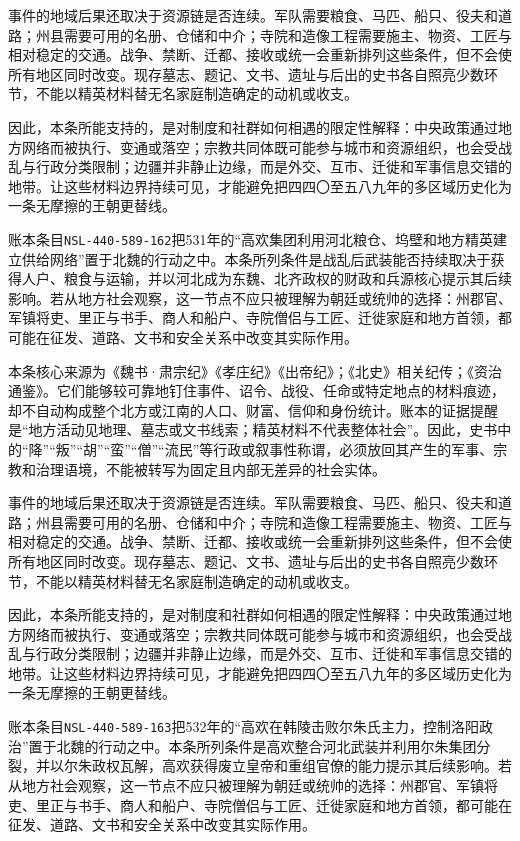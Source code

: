 事件的地域后果还取决于资源链是否连续。军队需要粮食、马匹、船只、役夫和道路；州县需要可用的名册、仓储和中介；寺院和造像工程需要施主、物资、工匠与相对稳定的交通。战争、禁断、迁都、接收或统一会重新排列这些条件，但不会使所有地区同时改变。现存墓志、题记、文书、遗址与后出的史书各自照亮少数环节，不能以精英材料替无名家庭制造确定的动机或收支。

因此，本条所能支持的，是对制度和社群如何相遇的限定性解释：中央政策通过地方网络而被执行、变通或落空；宗教共同体既可能参与城市和资源组织，也会受战乱与行政分类限制；边疆并非静止边缘，而是外交、互市、迁徙和军事信息交错的地带。让这些材料边界持续可见，才能避免把四四〇至五八九年的多区域历史化为一条无摩擦的王朝更替线。

账本条目\texttt{NSL-440-589-162}把531年的“高欢集团利用河北粮仓、坞壁和地方精英建立供给网络”置于北魏的行动之中。本条所列条件是战乱后武装能否持续取决于获得人户、粮食与运输，并以河北成为东魏、北齐政权的财政和兵源核心提示其后续影响。若从地方社会观察，这一节点不应只被理解为朝廷或统帅的选择：州郡官、军镇将吏、里正与书手、商人和船户、寺院僧侣与工匠、迁徙家庭和地方首领，都可能在征发、道路、文书和安全关系中改变其实际作用。

本条核心来源为《魏书·肃宗纪》《孝庄纪》《出帝纪》；《北史》相关纪传；《资治通鉴》。它们能够较可靠地钉住事件、诏令、战役、任命或特定地点的材料痕迹，却不自动构成整个北方或江南的人口、财富、信仰和身份统计。账本的证据提醒是“地方活动见地理、墓志或文书线索；精英材料不代表整体社会”。因此，史书中的“降”“叛”“胡”“蛮”“僧”“流民”等行政或叙事性称谓，必须放回其产生的军事、宗教和治理语境，不能被转写为固定且内部无差异的社会实体。

事件的地域后果还取决于资源链是否连续。军队需要粮食、马匹、船只、役夫和道路；州县需要可用的名册、仓储和中介；寺院和造像工程需要施主、物资、工匠与相对稳定的交通。战争、禁断、迁都、接收或统一会重新排列这些条件，但不会使所有地区同时改变。现存墓志、题记、文书、遗址与后出的史书各自照亮少数环节，不能以精英材料替无名家庭制造确定的动机或收支。

因此，本条所能支持的，是对制度和社群如何相遇的限定性解释：中央政策通过地方网络而被执行、变通或落空；宗教共同体既可能参与城市和资源组织，也会受战乱与行政分类限制；边疆并非静止边缘，而是外交、互市、迁徙和军事信息交错的地带。让这些材料边界持续可见，才能避免把四四〇至五八九年的多区域历史化为一条无摩擦的王朝更替线。

账本条目\texttt{NSL-440-589-163}把532年的“高欢在韩陵击败尔朱氏主力，控制洛阳政治”置于北魏的行动之中。本条所列条件是高欢整合河北武装并利用尔朱集团分裂，并以尔朱政权瓦解，高欢获得废立皇帝和重组官僚的能力提示其后续影响。若从地方社会观察，这一节点不应只被理解为朝廷或统帅的选择：州郡官、军镇将吏、里正与书手、商人和船户、寺院僧侣与工匠、迁徙家庭和地方首领，都可能在征发、道路、文书和安全关系中改变其实际作用。

